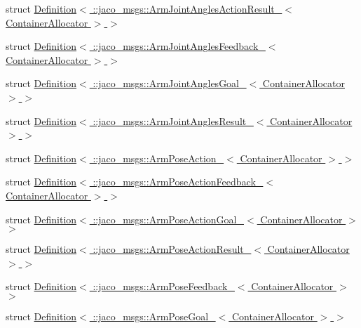 \begin{DoxyCompactItemize}
struct \hyperlink{structros_1_1message__traits_1_1Definition_3_01_1_1jaco__msgs_1_1ArmJointAnglesActionResult___3_01ContainerAllocator_01_4_01_4}{Definition$<$ \+::jaco\+\_\+msgs\+::\+Arm\+Joint\+Angles\+Action\+Result\+\_\+$<$ Container\+Allocator $>$ $>$}
\item 
struct \hyperlink{structros_1_1message__traits_1_1Definition_3_01_1_1jaco__msgs_1_1ArmJointAnglesFeedback___3_01ContainerAllocator_01_4_01_4}{Definition$<$ \+::jaco\+\_\+msgs\+::\+Arm\+Joint\+Angles\+Feedback\+\_\+$<$ Container\+Allocator $>$ $>$}
\item 
struct \hyperlink{structros_1_1message__traits_1_1Definition_3_01_1_1jaco__msgs_1_1ArmJointAnglesGoal___3_01ContainerAllocator_01_4_01_4}{Definition$<$ \+::jaco\+\_\+msgs\+::\+Arm\+Joint\+Angles\+Goal\+\_\+$<$ Container\+Allocator $>$ $>$}
\item 
struct \hyperlink{structros_1_1message__traits_1_1Definition_3_01_1_1jaco__msgs_1_1ArmJointAnglesResult___3_01ContainerAllocator_01_4_01_4}{Definition$<$ \+::jaco\+\_\+msgs\+::\+Arm\+Joint\+Angles\+Result\+\_\+$<$ Container\+Allocator $>$ $>$}
\item 
struct \hyperlink{structros_1_1message__traits_1_1Definition_3_01_1_1jaco__msgs_1_1ArmPoseAction___3_01ContainerAllocator_01_4_01_4}{Definition$<$ \+::jaco\+\_\+msgs\+::\+Arm\+Pose\+Action\+\_\+$<$ Container\+Allocator $>$ $>$}
\item 
struct \hyperlink{structros_1_1message__traits_1_1Definition_3_01_1_1jaco__msgs_1_1ArmPoseActionFeedback___3_01ContainerAllocator_01_4_01_4}{Definition$<$ \+::jaco\+\_\+msgs\+::\+Arm\+Pose\+Action\+Feedback\+\_\+$<$ Container\+Allocator $>$ $>$}
\item 
struct \hyperlink{structros_1_1message__traits_1_1Definition_3_01_1_1jaco__msgs_1_1ArmPoseActionGoal___3_01ContainerAllocator_01_4_01_4}{Definition$<$ \+::jaco\+\_\+msgs\+::\+Arm\+Pose\+Action\+Goal\+\_\+$<$ Container\+Allocator $>$ $>$}
\item 
struct \hyperlink{structros_1_1message__traits_1_1Definition_3_01_1_1jaco__msgs_1_1ArmPoseActionResult___3_01ContainerAllocator_01_4_01_4}{Definition$<$ \+::jaco\+\_\+msgs\+::\+Arm\+Pose\+Action\+Result\+\_\+$<$ Container\+Allocator $>$ $>$}
\item 
struct \hyperlink{structros_1_1message__traits_1_1Definition_3_01_1_1jaco__msgs_1_1ArmPoseFeedback___3_01ContainerAllocator_01_4_01_4}{Definition$<$ \+::jaco\+\_\+msgs\+::\+Arm\+Pose\+Feedback\+\_\+$<$ Container\+Allocator $>$ $>$}
\item 
struct \hyperlink{structros_1_1message__traits_1_1Definition_3_01_1_1jaco__msgs_1_1ArmPoseGoal___3_01ContainerAllocator_01_4_01_4}{Definition$<$ \+::jaco\+\_\+msgs\+::\+Arm\+Pose\+Goal\+\_\+$<$ Container\+Allocator $>$ $>$}

\end{DoxyCompactItemize}
